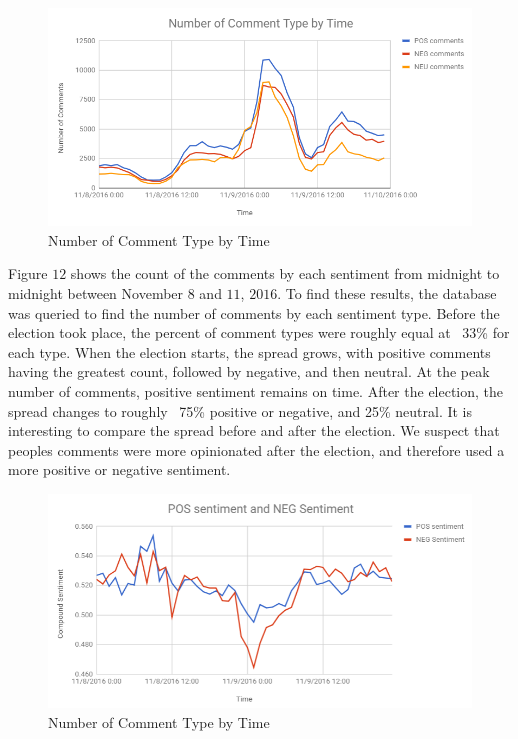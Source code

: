 \documentclass[letterpaper]{article}
\begin{document}
\begin{figure}[!htb]
\begin{center}
\includegraphics[scale=0.4]{Images/comment_count_sentiment.PNG}
\caption{Number of Comment Type by Time}
\label{fig1}
\end{center}
\end{figure}

Figure $12$ shows the count of the comments by each sentiment from midnight to midnight between November $8$ and $11$, $2016$. To find these results, the database was queried to find the number of comments by each sentiment type. Before the election took place, the percent of comment types were roughly equal at ~33\% for each type. When the election starts, the spread grows, with positive comments having the greatest count, followed by negative, and then neutral. At the peak number of comments, positive sentiment remains on time. After the election, the spread changes to roughly ~75\% positive or negative, and 25\% neutral. It is interesting to compare the spread before and after the election. We suspect that peoples comments were more opinionated after the election, and therefore used a more positive or negative sentiment.

\begin{figure}[!htb]
\begin{center}
\includegraphics[scale=0.4]{Images/pos_neg_sentiment.PNG}
\caption{Number of Comment Type by Time}
\label{fig1}
\end{center}
\end{figure}
\end{document}
